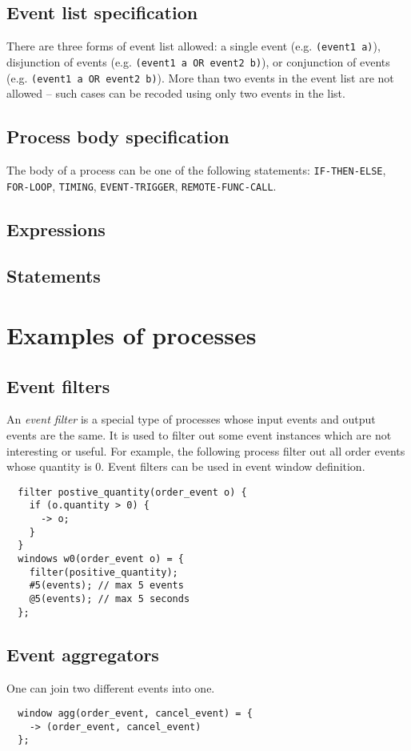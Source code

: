 \documentclass{pamsbook}
\begin{document}
\subsection{Event list specification}
There are three forms of event list allowed:
a single event (e.g. \verb+(event1 a)+), disjunction of events
(e.g. \verb+(event1 a OR event2 b)+), or
conjunction of events (e.g. \verb+(event1 a OR event2 b)+). 
More than two events in the event list are not allowed -- such cases can
be recoded using only two events in the list. 

\subsection{Process body specification}
The body of a process can be one of the following statements:
\verb+IF-THEN-ELSE+, \verb+FOR-LOOP+, \verb+TIMING+, 
\verb+EVENT-TRIGGER+, 
\verb+REMOTE-FUNC-CALL+. 

\subsection{Expressions}

\subsection{Statements}

\section{Examples of processes}
\subsection{Event filters}
An {\em event filter\/} is a special type of processes whose input events and output
events are the same. It is used to filter out some event instances which are
not interesting or useful. For example, the following process filter out all order
events whose quantity is 0. Event filters can be used in event window definition.
{\small
\begin{verbatim}
  filter postive_quantity(order_event o) {
    if (o.quantity > 0) {
      -> o;
    }
  }
  windows w0(order_event o) = {
    filter(positive_quantity);
    #5(events); // max 5 events
    @5(events); // max 5 seconds
  };
\end{verbatim}
}

\subsection{Event aggregators}
One can join two different events into one.
{\small
\begin{verbatim}
  window agg(order_event, cancel_event) = {
    -> (order_event, cancel_event)
  };
\end{verbatim}
}
\end{document}
